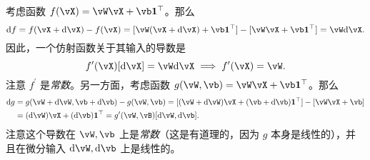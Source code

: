 \documentclass[../../book-main_zh.tex]{subfiles}
\begin{document}
\begin{example}
    考虑函数 \(f(\vX) = \vW\vX + \vb\vone^{\top}\)。那么
    \begin{equation}
        \odif{f} = f(\vX + \odif{\vX}) - f(\vX) = [\vW(\vX + \odif{\vX}) + \vb\vone^{\top}] - [\vW \vX + \vb \vone^{\top}] = \vW\odif{\vX}.
    \end{equation}
    因此，一个仿射函数关于其输入的导数是
    \begin{equation}
        f^{\prime}(\vX)[\odif{\vX}] = \vW\odif{\vX} \implies f^{\prime}(\vX) = \vW.
    \end{equation}
    注意 \(f^{\prime}\) 是\textit{常数}。另一方面，考虑函数 \(g(\vW, \vb) = \vW\vX + \vb\vone^{\top}\)。那么
    \begin{align}
        \odif{g} 
        &= g(\vW + \odif{\vW}, \vb + \odif{\vb}) - g(\vW, \vb) = [(\vW + \odif{\vW})\vX + (\vb + \odif{\vb})\vone^{\top}] - [\vW\vX + \vb] \\
        &= (\odif{\vW})\vX + (\odif{\vb})\vone^{\top} = g^{\prime}(\vW, \vB)[\odif{\vW}, \odif{\vb}].
    \end{align}
    注意这个导数在 \(\vW, \vb\) 上是\textit{常数}（这是有道理的，因为 \(g\) 本身是线性的），并且在微分输入 \(\odif{\vW}, \odif{\vb}\) 上是线性的。
\end{example}
\end{document}

